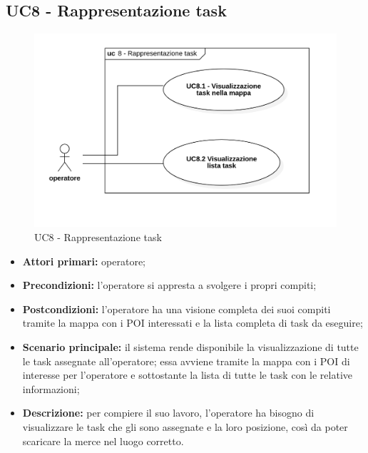 \subsection{UC8 - Rappresentazione task}

\begin{figure}[H]
	\centering
	\includegraphics[scale=0.52]{res/images/uc8.png}
	\caption{UC8 - Rappresentazione task}
\end{figure}


\begin{itemize}
	\item 	\textbf{Attori primari:} operatore;
	\item 	\textbf{Precondizioni:} l'operatore si appresta a svolgere i propri compiti;
	\item 	\textbf{Postcondizioni:} l'operatore ha una visione completa dei suoi compiti tramite la mappa con i POI interessati e la lista completa di task da eseguire;
	\item 	\textbf{Scenario principale:} il sistema rende disponibile la visualizzazione di tutte le task assegnate all'operatore; essa avviene tramite la mappa con i POI di interesse per l'operatore e sottostante la lista di tutte le task con le relative informazioni;
	\item 	\textbf{Descrizione:} per compiere il suo lavoro, l'operatore ha bisogno di visualizzare le task che gli sono assegnate e la loro posizione, così da poter scaricare la merce nel luogo corretto.

\end{itemize}

